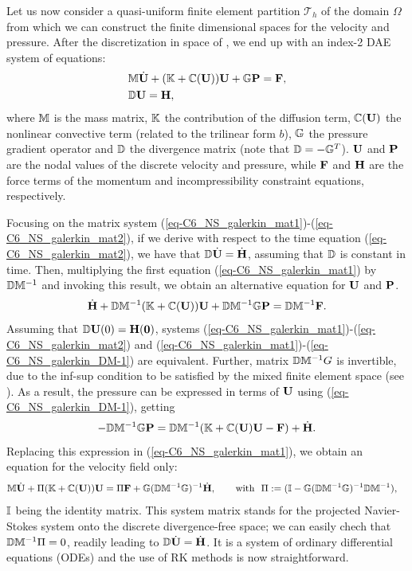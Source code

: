 Let us now consider a quasi-uniform finite element partition $\mathcal{T}_h$ of the domain $\Omega$ from which we can construct the finite dimensional spaces for the velocity and pressure. After the discretization in space of , we end up with an index-2 DAE system of equations:
\begin{align}
\label{eq-C6_NS_galerkin_mat1}
&\M\dot{\U}+(\K+\C(\U))\U+\G\P=\F,\\
\label{eq-C6_NS_galerkin_mat2}
&\D\U= \H,
\end{align}
where $\M$ is the mass matrix, $\K$ the contribution of the diffusion term, $\C(\U)$ the nonlinear convective term (related to the trilinear form $b$), $\G$ the pressure gradient operator and $\D$ the divergence matrix (note that $\D=-\G^T$). $\U$ and $\P$ are the nodal values of the discrete velocity and pressure, while $\F$ and $\H$ are the force terms of the momentum and incompressibility constraint equations, respectively. 

Focusing on the matrix system (\ref{eq-C6_NS_galerkin_mat1})-(\ref{eq-C6_NS_galerkin_mat2}), if we derive with respect to the time equation (\ref{eq-C6_NS_galerkin_mat2}), we have that $\D\dot{\U}= \dot{\H}$, assuming that $\D$ is constant in time. Then, multiplying the first equation (\ref{eq-C6_NS_galerkin_mat1}) by $\D\M^{-1}$ and invoking this result, we obtain an alternative equation for $\U$ and $\P$.
\begin{equation}
\label{eq-C6_NS_galerkin_DM-1}
\dot{\H} + \D\M^{-1}(\K+\C(\U))\U+\D\M^{-1}\G\P=\D\M^{-1}\F.
\end{equation}
Assuming that $\D\U(0) = \H(0)$, systems (\ref{eq-C6_NS_galerkin_mat1})-(\ref{eq-C6_NS_galerkin_mat2}) and (\ref{eq-C6_NS_galerkin_mat1})-(\ref{eq-C6_NS_galerkin_DM-1}) are equivalent. Further, matrix $\D\M^{-1} G$ is invertible, due to the inf-sup condition to be satisfied by the mixed finite element space (see \cite{elman_finite_2005}). As a result, the pressure can be expressed in terms of $\U$ using (\ref{eq-C6_NS_galerkin_DM-1}), getting
\begin{equation}
\label{eq-C6_NS_galerkin_DM-2}
-\D\M^{-1}\G\P=\D\M^{-1}(\K+\C(\U)\U- \F) + \dot{\H}.
\end{equation}
Replacing this expression in (\ref{eq-C6_NS_galerkin_mat1}), we obtain an equation for the velocity field only:
\begin{align}
\label{eq-C6_NS_galerkin_ou}
&\M\dot{\U}+ \Pi(\K+\C(\U))\U  = \Pi\F + \G(\D\M^{-1}\G)^{-1} \dot{\H}, \qquad \hbox{with } \ \Pi := 
(\I - \G(\D\M^{-1}\G)^{-1}\D\M^{-1}), \end{align}
$\I$ being the identity matrix. This system matrix stands for the projected Navier-Stokes system onto the discrete divergence-free space; we can easily chech that $\D\M^{-1}\Pi = 0$, readily leading to $\D \dot{\U} = \dot{\H}$. It is a system of ordinary differential equations (ODEs) and the use of RK methods is now straightforward. 

